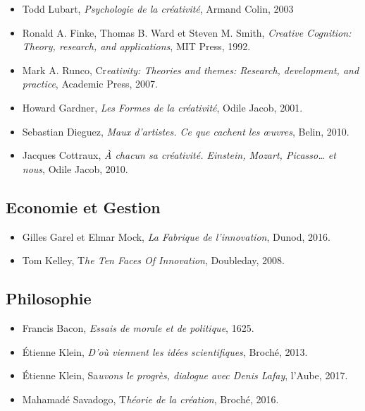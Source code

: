\documentclass{article}
\begin{document}
\begin{itemize}

\item Todd Lubart, \textit{Psychologie de la créativité}, Armand Colin, 2003
\item Ronald A. Finke, Thomas B. Ward et Steven M. Smith, \textit{Creative Cognition: Theory, research, and applications}, MIT Press, 1992.
\item Mark A. Runco, Cr\textit{eativity: Theories and themes: Research, development, and practice}, Academic Press, 2007.
\item Howard Gardner, \textit{Les Formes de la créativité}, Odile Jacob, 2001.
\item Sebastian Dieguez, \textit{Maux d’artistes. Ce que cachent les œuvres}, Belin, 2010.
\item Jacques Cottraux, \textit{À chacun sa créativité. Einstein, Mozart, Picasso… et nous}, Odile Jacob, 2010.

\end{itemize}

\subsection{Economie et Gestion}

\begin{itemize}

\item Gilles Garel et Elmar Mock, \textit{La Fabrique de l'innovation}, Dunod, 2016.
\item Tom Kelley, T\textit{he Ten Faces Of Innovation}, Doubleday, 2008.

\end{itemize}

\subsection{Philosophie}

\begin{itemize}

\item Francis Bacon, \textit{Essais de morale et de politique}, 1625.
\item Étienne Klein, \textit{D'où viennent les idées scientifiques}, Broché, 2013.
\item Étienne Klein, Sa\textit{uvons le progrès, dialogue avec Denis Lafay}, l’Aube, 2017.
\item Mahamadé Savadogo, T\textit{héorie de la création}, Broché, 2016.	

\end{itemize}
\end{document}
